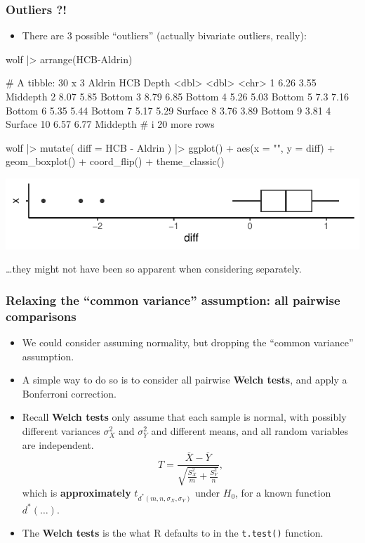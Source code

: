 \documentclass[a4paper]{article}\usepackage[]{graphicx}\usepackage[]{xcolor}
\makeatletter
\def\maxwidth{ %
  \ifdim\Gin@nat@width>\linewidth
    \linewidth
  \else
    \Gin@nat@width
  \fi
}
\makeatother
\begin{document}
\subsubsection{Outliers ?!}
\begin{itemize}
	\item There are 3 possible ``outliers'' (actually bivariate outliers, really):
\end{itemize}
\begin{Schunk}
\begin{Sinput}
wolf |> arrange(HCB-Aldrin)
\end{Sinput}
\begin{Soutput}
# A tibble: 30 x 3
   Aldrin   HCB Depth   
    <dbl> <dbl> <chr>   
 1   6.26  3.55 Middepth
 2   8.07  5.85 Bottom  
 3   8.79  6.85 Bottom  
 4   5.26  5.03 Bottom  
 5   7.3   7.16 Bottom  
 6   5.35  5.44 Bottom  
 7   5.17  5.29 Surface 
 8   3.76  3.89 Bottom  
 9   3.81  4    Surface 
10   6.57  6.77 Middepth
# i 20 more rows
\end{Soutput}
\begin{Sinput}
wolf |> mutate(
  diff = HCB - Aldrin
) |> 
  ggplot() + aes(x = "", y = diff) + 
  geom_boxplot() + 
  coord_flip() +
  theme_classic()
\end{Sinput}


{\centering \includegraphics[width=\maxwidth]{figure/listings-unnamed-chunk-259-1} 

}

\end{Schunk}
\dots they might not have been so apparent when considering separately.
\subsubsection{Relaxing the ``common variance'' assumption: all pairwise comparisons}
\begin{itemize}
	\item We could consider assuming normality, but dropping the ``common variance'' assumption.
	\item A simple way to do so is to consider all pairwise \textbf{Welch tests}, and apply a Bonferroni correction.
	\item Recall \textbf{Welch tests} only assume that each sample is normal, with possibly different variances \( \sigma_X^2 \) and \( \sigma_Y^2 \) and different means, and all random variables are independent.
	\[
		T = \frac{\overline{X} - \overline{Y}}{\sqrt{\frac{S_X^2}{m} + \frac{S_Y^2}{n}}},
	\]
	which is \textbf{approximately} \( t_{d^\ast(m,n,\sigma_X,\sigma_Y)} \) under \( H_0 \), for a known function \( d^\ast(\dots) \).
	\item The \textbf{Welch tests} is the what R defaults to in the \lstinline|t.test()| function.
\end{itemize}
\end{document}
